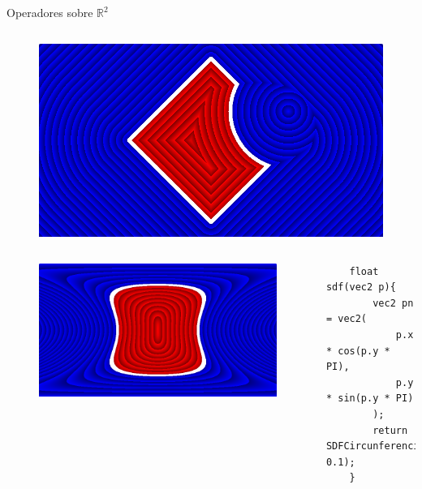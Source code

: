 \begin{frame}[fragile]{Operadores sobre \(\mathbb{R}^2\)}
\begin{columns}[c, onlytextwidth]
        \column{1.5in}
            \begin{figure}[H]
              \centering
              \includegraphics[width=1.0\textwidth]{imagenes/sdf/2d/sdf_subtract-3.png}
            \end{figure}
        
    \end{columns}
    
    \begin{columns}[c, onlytextwidth]
        \column{1.5in}
            \begin{figure}[H]
              \centering
              \includegraphics[width=1.0\textwidth]{imagenes/sdf/2d/sdf_deform.png}
            \end{figure}
        
        \column{\dimexpr\paperwidth-10pt}
            \begin{lstlisting}
    float sdf(vec2 p){
    	vec2 pn = vec2(
    	    p.x * cos(p.y * PI),
    	    p.y * sin(p.y * PI)
    	);
    	return SDFCircunferencia(pn, 0.1);
    }
            \end{lstlisting}
        
    \end{columns}

\end{frame}


